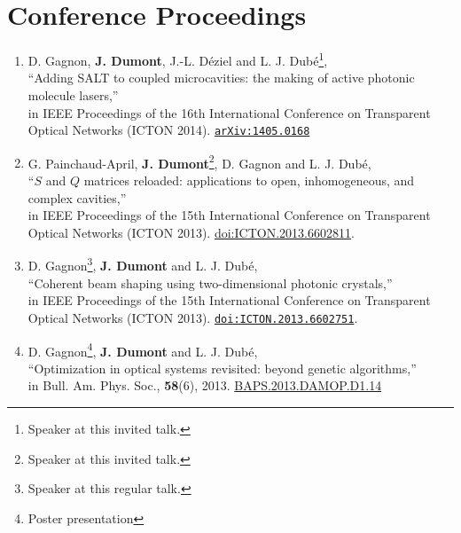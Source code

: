 \clearpage
\section*{Conference Proceedings}
\renewcommand*{\thefootnote}{\roman{footnote}}
\setcounter{footnote}{0}

\begin{enumerate}
 \item[\cite{GAG2014b}] D. Gagnon, \textbf{J. Dumont}, J.-L. Déziel and L. J. Dubé\footnote{Speaker at this invited talk.}, \\
	``Adding SALT to coupled microcavities: the making of active photonic molecule lasers,''\\
	in IEEE Proceedings of the 16th International Conference on Transparent Optical Networks (ICTON 2014).
	\href{http://arxiv.org/abs/1405.0168}{\texttt{arXiv:1405.0168}}
 \item[\cite{GAP2013b}] G. Painchaud-April, \textbf{J. Dumont}\footnote{Speaker at this invited talk.}, D. Gagnon and L. J. Dubé, \\
	``$S$ and $Q$ matrices reloaded: applications to open, inhomogeneous, and complex cavities,''\\
	in IEEE Proceedings of the 15th International Conference on Transparent Optical Networks (ICTON 2013).
	\href{http://dx.doi.org/10.1109/ICTON.2013.6602811}{doi:ICTON.2013.6602811}.
 \item[\cite{GAG2013a}] D. Gagnon\footnote{Speaker at this regular talk.}, \textbf{J. Dumont} and L. J. Dubé, \\
	``Coherent beam shaping using two-dimensional photonic crystals,''\\
	in IEEE Proceedings of the 15th International Conference on Transparent Optical Networks (ICTON 2013).
	\href{http://dx.doi.org/10.1109/ICTON.2013.6602751}{\texttt{doi:ICTON.2013.6602751}}.
 \item[\cite{GAG2013b}] D. Gagnon\footnote{Poster presentation}, \textbf{J. Dumont} and L. J. Dubé, \\
	``Optimization in optical systems revisited: beyond genetic algorithms,''\\
	in Bull. Am. Phys. Soc., \textbf{58}(6), 2013. \href{http://meetings.aps.org/link/BAPS.2013.DAMOP.D1.14}{BAPS.2013.DAMOP.D1.14}
\end{enumerate}


